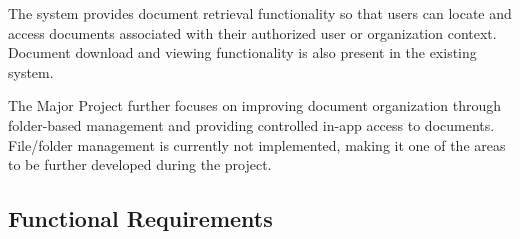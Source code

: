 \documentclass[12pt]{article}
\begin{document}
The system provides document retrieval functionality so that users can locate and access documents associated with their authorized user or organization context. Document download and viewing functionality is also present in the existing system.

The Major Project further focuses on improving document organization through folder-based management and providing controlled in-app access to documents. File/folder management is currently not implemented, making it one of the areas to be further developed during the project.


\subsection{Functional Requirements}
\end{document}
